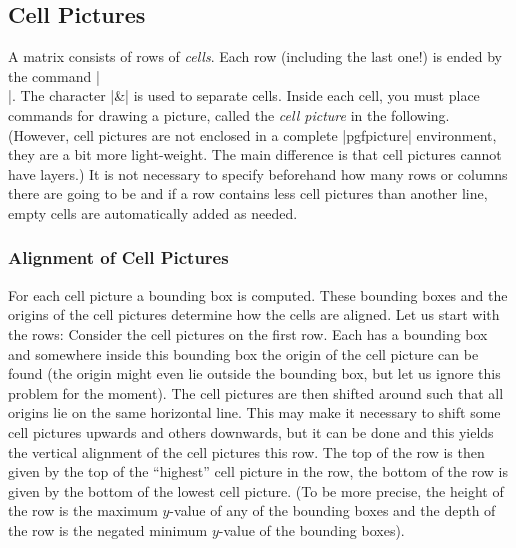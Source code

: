 \subsection{Cell Pictures}
\label{section-tikz-cell-pictures}

A matrix consists of rows of \emph{cells}. Each row (including the last one!)
is ended by the command |\\|. The character |&| is used to separate cells.
Inside each cell, you must place commands for drawing a picture, called the
\emph{cell picture} in the following. (However, cell pictures are not enclosed
in a complete |{pgfpicture}| environment, they are a bit more light-weight. The
main difference is that cell pictures cannot have layers.) It is not necessary
to specify beforehand how many rows or columns there are going to be and if a
row contains less cell pictures than another line, empty cells are
automatically added as needed.


\subsubsection{Alignment of Cell Pictures}

For each cell picture a bounding box is computed. These bounding boxes and the
origins of the cell pictures determine how the cells are aligned. Let us start
with the rows: Consider the cell pictures on the first row. Each has a bounding
box and somewhere inside this bounding box the origin of the cell picture can
be found (the origin might even lie outside the bounding box, but let us ignore
this problem for the moment). The cell pictures are then shifted around such
that all origins lie on the same horizontal line. This may make it necessary to
shift some cell pictures upwards and others downwards, but it can be done and
this yields the vertical alignment of the cell pictures this row. The top of
the row is then given by the top of the ``highest'' cell picture in the row,
the bottom of the row is given by the bottom of the lowest cell picture. (To be
more precise, the height of the row is the maximum $y$-value of any of the
bounding boxes and the depth of the row is the negated minimum $y$-value of the
bounding boxes).
%
\begin{codeexample}[]
\end{codeexample}

